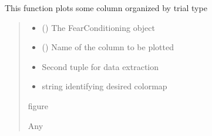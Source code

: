 \documentclass[letterpaper,10pt,english]{sphinxmanual}
\begin{document}
\begin{fulllineitems}
\label{\detokenize{BurrowFearConditioning:BurrowFearConditioning.plot_column_by_trial_type}}
\pysigstartsignatures
{}
\pysigstopsignatures
\sphinxAtStartPar
This function plots some column organized by trial type
\begin{quote}\begin{description}
\begin{itemize}
\item {} 
\sphinxAtStartPar
{} () \textendash{} The FearConditioning object

\item {} 
\sphinxAtStartPar
{} () \textendash{} Name of the column to be plotted

\item {} 
\sphinxAtStartPar
{} \textendash{} Second tuple for data extraction

\item {} 
\sphinxAtStartPar
{} \textendash{} string identifying desired colormap

\end{itemize}

\sphinxAtStartPar
figure

\sphinxAtStartPar
Any

\end{description}\end{quote}

\end{fulllineitems}
\end{document}
